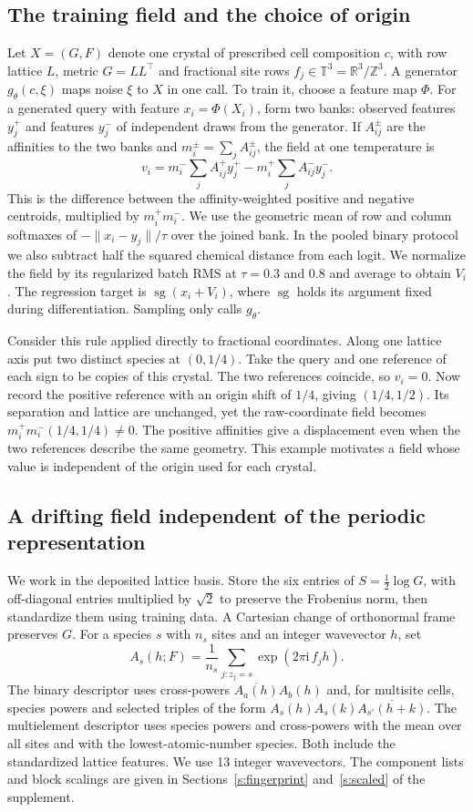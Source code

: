 \documentclass[10pt]{article}
\newcommand{\T}{\mathbb T}
\newcommand{\R}{\mathbb R}
\newcommand{\sg}{\operatorname{sg}}
\begin{document}
\subsection{The training field and the choice of origin}
Let $X=(G,F)$ denote one crystal of prescribed cell composition $c$, with row lattice $L$, metric $G=LL^\top$ and fractional site rows $f_j\in\T^3=\R^3/\mathbb Z^3$. A generator $g_\theta(c,\xi)$ maps noise $\xi$ to $X$ in one call. To train it, choose a feature map $\Phi$. For a generated query with feature $x_i=\Phi(X_i)$, form two banks: observed features $y_j^+$ and features $y_j^-$ of independent draws from the generator. If $A_{ij}^\pm$ are the affinities to the two banks and $m_i^\pm=\sum_j A_{ij}^\pm$, the field at one temperature is
\[
 v_i=m_i^-\sum_j A^+_{ij}y_j^+-m_i^+\sum_j A^-_{ij}y_j^- .
\]
This is the difference between the affinity-weighted positive and negative centroids, multiplied by $m_i^+m_i^-$. We use the geometric mean of row and column softmaxes of $-\|x_i-y_j\|/\tau$ over the joined bank. In the pooled binary protocol we also subtract half the squared chemical distance from each logit. We normalize the field by its regularized batch RMS at $\tau=0.3$ and $0.8$ and average to obtain $V_i$. The regression target is $\sg(x_i+V_i)$, where $\sg$ holds its argument fixed during differentiation. Sampling only calls $g_\theta$.

Consider this rule applied directly to fractional coordinates. Along one lattice axis put two distinct species at $(0,1/4)$. Take the query and one reference of each sign to be copies of this crystal. The two references coincide, so $v_i=0$. Now record the positive reference with an origin shift of $1/4$, giving $(1/4,1/2)$. Its separation and lattice are unchanged, yet the raw-coordinate field becomes $m_i^+m_i^-(1/4,1/4)\ne0$. The positive affinities give a displacement even when the two references describe the same geometry. This example motivates a field whose value is independent of the origin used for each crystal.

\subsection{A drifting field independent of the periodic representation}
We work in the deposited lattice basis. Store the six entries of $S=\tfrac12\log G$, with off-diagonal entries multiplied by $\sqrt{2}$ to preserve the Frobenius norm, then standardize them using training data. A Cartesian change of orthonormal frame preserves $G$. For a species $s$ with $n_s$ sites and an integer wavevector $h$, set
\[
 A_s(h;F)=\frac1{n_s}\sum_{j:z_j=s}\exp(2\pi\mathrm{i}\,f_jh).
\]
The binary descriptor uses cross-powers $\overline{A_a(h)}A_b(h)$ and, for multisite cells, species powers and selected triples of the form $A_s(h)A_s(k)\overline{A_{s'}(h+k)}$. The multielement descriptor uses species powers and cross-powers with the mean over all sites and with the lowest-atomic-number species. Both include the standardized lattice features. We use 13 integer wavevectors. The component lists and block scalings are given in Sections~\ref{s:fingerprint} and~\ref{s:scaled} of the supplement.
\end{document}
